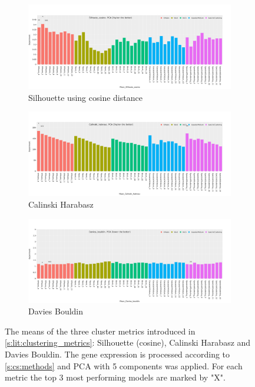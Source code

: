 \begin{figure}[H]
    \captionsetup[subfigure]{justification=Centering}
    \centering
    \begin{subfigure}[!t]{0.85\textwidth}
        \includegraphics[width=\textwidth]{Sections/ClusteringAnalysis/Resources/cs_top3/PCA_top3_Silhoute_cosine.png}
        \caption{Silhouette using cosine distance}
        \label{fig:cs:cosine}
    \end{subfigure}
    \centering
    \begin{subfigure}[!t]{0.85\textwidth}
        \includegraphics[width=\textwidth]{Sections/ClusteringAnalysis/Resources/cs_top3/PCA_top3_Calinski_habrasz.png}
        \caption{Calinski Harabasz}
        \label{fig:cs:cal_hab}
    \end{subfigure}
    \centering
    \begin{subfigure}[!t]{0.85\textwidth}
        \includegraphics[width=\textwidth]{Sections/ClusteringAnalysis/Resources/cs_top3/PCA_top3_Davies_bouldin.png}
        \caption{Davies Bouldin}
        \label{fig:cs:dav_boul}
    \end{subfigure}
    \caption{The means of the three cluster metrics introduced in \cref{s:lit:clustering_metrics}: Silhouette (cosine), Calinski Harabasz and Davies Bouldin. The gene expression is processed according to \cref{s:cs:methods} and PCA with 5 components was applied. For each metric the top 3 most performing models are marked by "X". }
    \label{fig:cs:cs_metrics}
\end{figure}


